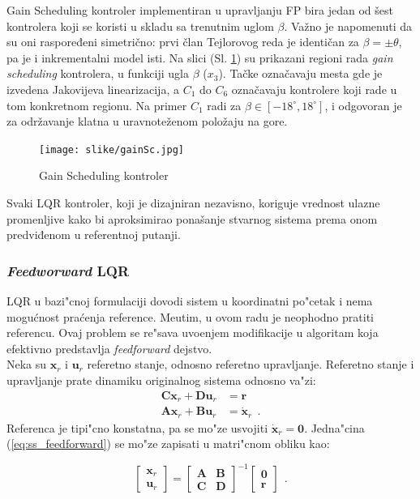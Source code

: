 \documentclass[a4paper,11pt]{article}
\theoremstyle{definition} \newtheorem{deff}{Definicija}[section]
\theoremstyle{definition} \newtheorem{prim}[deff]{Primer}
\theoremstyle{plain} \newtheorem{teor}[deff]{Teorema}
\newcommand{\vect}[1]{\boldsymbol{\mathbf{#1}}}
\begin{document}
	Gain Scheduling kontroler implementiran u upravljanju FP bira jedan od šest kontrolera koji se koristi u skladu sa trenutnim uglom $\beta$. Važno je napomenuti da su oni raspoređeni simetrično: prvi član Tejlorovog reda je identičan za $\beta = \pm \theta$, pa je i inkrementalni model isti. 
	Na slici (Sl. \ref{fig:ganSc}) su prikazani regioni rada \emph{gain scheduling} kontrolera, u funkciji ugla $\beta$ ($x_3$). Tačke označavaju mesta gde je izvedena Jakovijeva linearizacija, a $C_1$ do $C_6$ označavaju kontrolere koji rade u tom konkretnom regionu. Na primer $C_1$ radi za $\beta \in [-18^\circ, 18^\circ]$, i odgovoran je za održavanje klatna u uravnoteženom položaju na gore.
	
	\begin{figure}[!h]
		\centering
		\texttt{[image: slike/gainSc.jpg]}
		\caption{Gain Scheduling kontroler \cite{inicijalna}}
		\label{fig:ganSc}
	\end{figure}
	
	Svaki LQR kontroler, koji je dizajniran nezavisno, koriguje vrednost ulazne promenljive kako bi aproksimirao ponašanje stvarnog sistema prema onom predviđenom u referentnoj putanji.\\
	
	\subsubsection{\emph{Feedworward} LQR}
	LQR u bazi"cnoj formulaciji dovodi sistem u koordinatni po"cetak i nema mogu\'cnost pra\'cenja reference. Me\dj utim, u ovom radu je neophodno pratiti referencu. Ovaj problem se re"sava uvo\dj enjem modifikacije u algoritam koja efektivno predstavlja \emph{feedforward} dejstvo.\\
	
	Neka su $\vect{x}_r$ i $\vect{u}_r$ referetno stanje, odnosno referetno upravljanje. Referetno stanje i upravljanje prate dinamiku originalnog sistema odnosno va"zi:
	\begin{align}\label{eq:ss_feedforward}
		\vect{C}\vect{x}_r + \vect{D}\vect{u}_r &= \vect{r}\\
		\vect{A}\vect{x}_r + \vect{B}\vect{u}_r &= \dot{\vect{x}}_r~~.
	\end{align}
	Referenca je tipi"cno konstatna, pa se mo"ze usvojiti  $\dot{\vect{x}}_r = \vect{0}$. Jedna"cina (\ref{eq:ss_feedforward}) se mo"ze zapisati u matri"cnom obliku kao:

	
	
	\begin{equation}\label{eq:ss_ff_matrix}
		\begin{bmatrix} \vect{x}_r \\  \vect{u}_r \end{bmatrix} = 
		\begin{bmatrix} \vect{A} &  \vect{B} \\  \vect{C} &  \vect{D} \end{bmatrix}^{-1}
		\begin{bmatrix} \vect{0} \\  \vect{r} \end{bmatrix}~~.
	\end{equation} \vspace{1cm}
	
\end{document}
